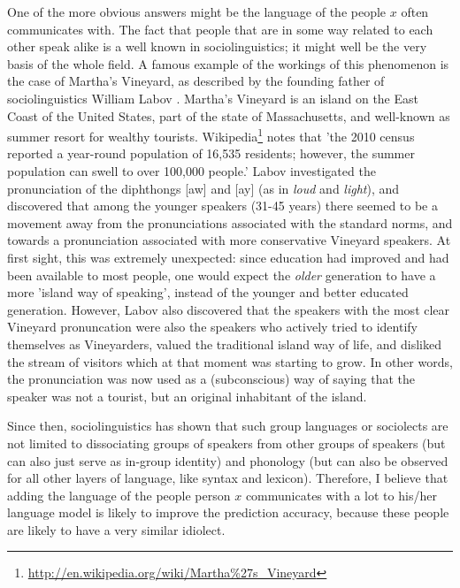 \documentclass[12pt]{article}
\begin{document}
One of the more obvious answers might be the language of the people $x$ often communicates with. The fact that people that are in some way related to each other speak alike is a well known in sociolinguistics; it might well be the very basis of the whole field. A famous example of the workings of this phenomenon is the case of Martha's Vineyard, as described by the founding father of sociolinguistics William Labov \cite{labov63}. Martha's Vineyard is an island on the East Coast of the United States, part of the state of Massachusetts, and well-known as summer resort for wealthy tourists. Wikipedia\footnote{\url{http://en.wikipedia.org/wiki/Martha\%27s\_Vineyard}} notes that 'the 2010 census reported a year-round population of 16,535 residents; however, the summer population can swell to over 100,000 people.' Labov investigated the pronunciation of the diphthongs [aw] and [ay] (as in \emph{loud} and \emph{light}), and discovered that among the younger speakers (31-45 years) there seemed to be a movement away from the pronunciations associated with the standard norms, and towards a pronunciation associated with more conservative  Vineyard speakers. At first sight, this was extremely unexpected: since education had improved and had been available to most people, one would expect the \emph{older} generation to have a more 'island way of speaking', instead of the younger and better educated generation. However, Labov also discovered that the speakers with the most clear Vineyard pronuncation were also the speakers who actively tried to identify themselves as Vineyarders, valued the traditional island way of life, and disliked the stream of visitors which at that moment was starting to grow. In other words, the pronunciation was now used as a (subconscious) way of saying that the speaker was not a tourist, but an original inhabitant of the island.

Since then, sociolinguistics has shown that such group languages or sociolects are not limited to dissociating groups of speakers from other groups of speakers (but can also just serve as in-group identity) and phonology (but can also be observed for all other layers of language, like syntax and lexicon). Therefore, I believe that adding the language of the people person $x$ communicates with a lot to his/her language model is likely to improve the prediction accuracy, because these people are likely to have a very similar idiolect.
\end{document}
